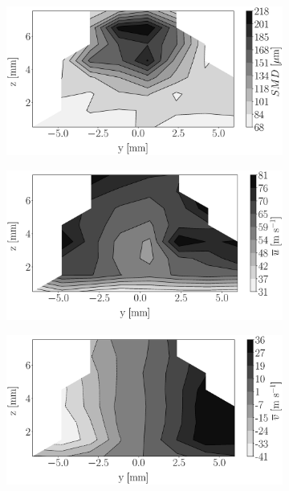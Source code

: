 \begin{figure}[h!]
\flushleft
\begin{subfigure}[b]{0.22\textwidth}
	\centering
   \includegraphics[scale=0.17]{./part2_developments/figures_ch5_resolved_JICF/injectors_SLI/uG100_dx20_x10_SMD_map.eps}
\end{subfigure}
   \hspace{0.17in}
\begin{subfigure}[b]{0.22\textwidth}
	\centering
   \includegraphics[scale=0.17]{./part2_developments/figures_ch5_resolved_JICF/injectors_SLI/uG100_dx20_x10_ux_mean_map.eps}
\end{subfigure}
   \hspace{0.17in}
\begin{subfigure}[b]{0.22\textwidth}
	\centering
   \includegraphics[scale=0.17]{./part2_developments/figures_ch5_resolved_JICF/injectors_SLI/uG100_dx20_x10_uy_mean_map.eps}

\end{subfigure}
\end{figure}
